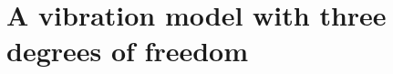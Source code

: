 \documentclass{article}
\begin{document}

\clearpage

\section{A vibration model with three degrees of freedom}
\label{sec:3dof}
\end{document}
